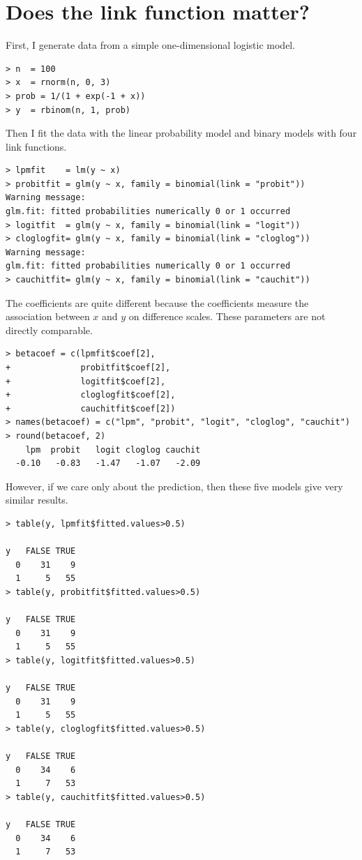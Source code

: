 \section{Does the link function matter?}

First, I generate data from a simple one-dimensional logistic model.

 
\begin{lstlisting}
> n  = 100
> x  = rnorm(n, 0, 3)
> prob = 1/(1 + exp(-1 + x))
> y  = rbinom(n, 1, prob)
\end{lstlisting}


Then I fit the data with the linear probability model and binary models with four link functions. 
\begin{lstlisting}
> lpmfit    = lm(y ~ x)
> probitfit = glm(y ~ x, family = binomial(link = "probit"))
Warning message:
glm.fit: fitted probabilities numerically 0 or 1 occurred 
> logitfit  = glm(y ~ x, family = binomial(link = "logit"))
> cloglogfit= glm(y ~ x, family = binomial(link = "cloglog"))
Warning message:
glm.fit: fitted probabilities numerically 0 or 1 occurred 
> cauchitfit= glm(y ~ x, family = binomial(link = "cauchit"))
\end{lstlisting}


 
The coefficients are quite different because the coefficients measure the association between $x$ and $y$ on difference scales. These parameters are not directly comparable.  
\begin{lstlisting}
> betacoef = c(lpmfit$coef[2], 
+              probitfit$coef[2], 
+              logitfit$coef[2], 
+              cloglogfit$coef[2], 
+              cauchitfit$coef[2])
> names(betacoef) = c("lpm", "probit", "logit", "cloglog", "cauchit")
> round(betacoef, 2)
    lpm  probit   logit cloglog cauchit 
  -0.10   -0.83   -1.47   -1.07   -2.09
\end{lstlisting}


However, if we care only about the prediction, then these five models give very similar results. 

\begin{lstlisting}
> table(y, lpmfit$fitted.values>0.5)
   
y   FALSE TRUE
  0    31    9
  1     5   55
> table(y, probitfit$fitted.values>0.5)
   
y   FALSE TRUE
  0    31    9
  1     5   55
> table(y, logitfit$fitted.values>0.5)
   
y   FALSE TRUE
  0    31    9
  1     5   55
> table(y, cloglogfit$fitted.values>0.5)
   
y   FALSE TRUE
  0    34    6
  1     7   53
> table(y, cauchitfit$fitted.values>0.5)
   
y   FALSE TRUE
  0    34    6
  1     7   53
  \end{lstlisting}
  
